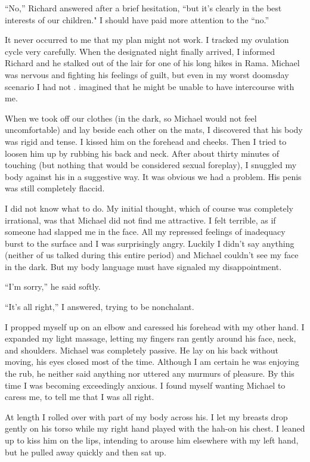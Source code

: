 \documentclass[]{article}
\begin{document}
“No,” Richard answered after a brief hesitation, “but it’s clearly in the best interests of our children."  I should have paid more attention to the “no.”

It never occurred to me that my plan might not work.  I tracked my ovulation cycle very carefully.  When the designated night finally arrived, I informed Richard and he stalked out of the lair for one of his long hikes in Rama.  Michael was nervous and fighting his feelings of guilt, but even in my worst doomsday scenario I had not .  imagined that he might be unable to have intercourse with me.

When we took off our clothes (in the dark, so Michael would not feel uncomfortable) and lay beside each other on the mats, I discovered that his body was rigid and tense.  I kissed him on the forehead and cheeks.  Then I tried to loosen him up by rubbing his back and neck.  After about thirty minutes of touching (but nothing that would be considered sexual foreplay), I snuggled my body against his in a suggestive way.  It was obvious we had a problem.  His penis was still completely flaccid.

I did not know what to do.  My initial thought, which of course was completely irrational, was that Michael did not find me attractive.  I felt terrible, as if someone had slapped me in the face.  All my repressed feelings of inadequacy burst to the surface and I was surprisingly angry.  Luckily I didn’t say anything (neither of us talked during this entire period) and Michael couldn’t see my face in the dark.  But my body language must have signaled my disappointment.

“I’m sorry,” he said softly.

“It’s all right,” I answered, trying to be nonchalant.

I propped myself up on an elbow and caressed his forehead with my other hand.  I expanded my light massage, letting my fingers ran gently around his face, neck, and shoulders.  Michael was completely passive.  He lay on his back without moving, his eyes closed most of the time.  Although I am certain he was enjoying the rub, he neither said anything nor uttered any murmurs of pleasure.  By this time I was becoming exceedingly anxious.  I found myself wanting Michael to caress me, to tell me that I was all right.

At length I rolled over with part of my body across his.  I let my breasts drop gently on his torso while my right hand played with the hah-on his chest.  I leaned up to kiss him on the lips, intending to arouse him elsewhere with my left hand, but he pulled away quickly and then sat up.
\end{document}
